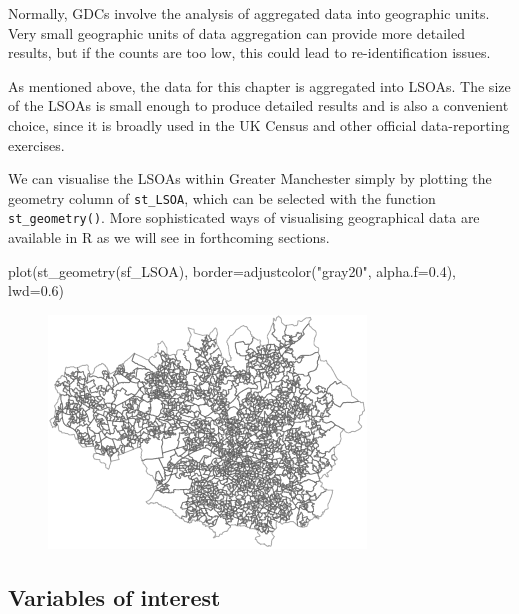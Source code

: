 \documentclass[
  letterpaper,
  DIV=11,
  numbers=noendperiod]{scrreprt}
\newenvironment{Shaded}{\begin{snugshade}}{\end{snugshade}}
\newcommand{\AttributeTok}[1]{\textcolor[rgb]{0.40,0.45,0.13}{#1}}
\newcommand{\FloatTok}[1]{\textcolor[rgb]{0.68,0.00,0.00}{#1}}
\newcommand{\FunctionTok}[1]{\textcolor[rgb]{0.28,0.35,0.67}{#1}}
\newcommand{\NormalTok}[1]{\textcolor[rgb]{0.00,0.23,0.31}{#1}}
\newcommand{\StringTok}[1]{\textcolor[rgb]{0.13,0.47,0.30}{#1}}
\begin{document}
Normally, GDCs involve the analysis of aggregated data into geographic
units. Very small geographic units of data aggregation can provide more
detailed results, but if the counts are too low, this could lead to
re-identification issues.

As mentioned above, the data for this chapter is aggregated into LSOAs.
The size of the LSOAs is small enough to produce detailed results and is
also a convenient choice, since it is broadly used in the UK Census and
other official data-reporting exercises.

We can visualise the LSOAs within Greater Manchester simply by plotting
the geometry column of \texttt{st\_LSOA}, which can be selected with the
function \texttt{st\_geometry()}. More sophisticated ways of visualising
geographical data are available in R as we will see in forthcoming
sections.

\begin{Shaded}
\begin{Highlighting}[]
\FunctionTok{plot}\NormalTok{(}\FunctionTok{st\_geometry}\NormalTok{(sf\_LSOA), }\AttributeTok{border=}\FunctionTok{adjustcolor}\NormalTok{(}\StringTok{"gray20"}\NormalTok{, }\AttributeTok{alpha.f=}\FloatTok{0.4}\NormalTok{), }\AttributeTok{lwd=}\FloatTok{0.6}\NormalTok{)}
\end{Highlighting}
\end{Shaded}

\begin{figure}[H]

{\centering \includegraphics{geodemographics_files/figure-pdf/unnamed-chunk-4-1.pdf}

}

\end{figure}

\hypertarget{variables-of-interest}{%
\subsection{Variables of interest}\label{variables-of-interest}}
\end{document}
